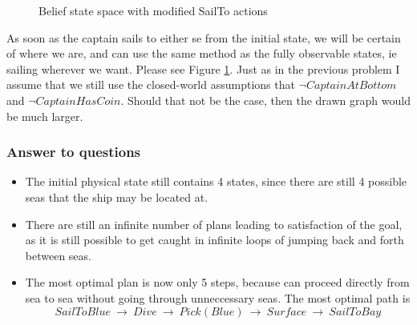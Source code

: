 \documentclass[a4paper, 11pt]{article}
\begin{document}
\begin{figure}[h]

    \caption{Belief state space with modified SailTo actions}
\label{fig:beliefstatemodified}
\end{figure}

As soon as the captain sails to either se from the initial state, we will be certain of where we are, and can use the same method as the fully observable states, ie sailing wherever we want. Please see Figure \ref{fig:beliefstatemodified}. Just as in the previous problem I assume that we still use the closed-world assumptions that $\neg CaptainAtBottom$ and $\neg CaptainHasCoin$. Should that not be the case, then the drawn graph would be much larger.

\subsubsection{Answer to questions}

\begin{itemize}
	\item The initial physical state still contains 4 states, since there are still 4 possible seas that the ship may be located at.
	\item There are still an infinite number of plans leading to satisfaction of the goal, as it is still possible to get caught in infinite loops of jumping back and forth between seas. 
	\item The most optimal plan is now only 5 steps, because can proceed directly from sea to sea without going through unneccessary seas. The most optimal path is
	\begin{equation}
		SailToBlue ~\rightarrow~ Dive ~\rightarrow~ Pick(Blue) ~\rightarrow~ Surface ~\rightarrow~ SailToBay
	\end{equation}
\end{itemize}
\end{document}
